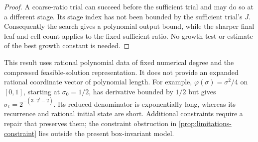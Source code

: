 \begin{proof}
A coarse-ratio trial can succeed before the sufficient trial and may do
so at a different stage.  Its stage index has not been bounded by the
sufficient trial's $J$.  Consequently the search gives a polynomial
output bound, while the sharper final leaf-and-cell count applies to the
fixed sufficient ratio.  No growth test or estimate of the best growth
constant is needed.
\end{proof}

This result uses rational polynomial data of fixed numerical degree and
the compressed feasible-solution representation.  It does not provide an
expanded rational coordinate vector of polynomial length.  For example,
$\varphi(\sigma)=\sigma^2/4$ on $[0,1]$, starting at $\sigma_0=1/2$,
has derivative bounded by $1/2$ but gives
$\sigma_t=2^{-(3\cdot2^t-2)}$.  Its reduced denominator is exponentially
long, whereas its recurrence and rational initial state are short.
Additional constraints require a repair that preserves them; the constraint
obstruction in \cref{prop:limitations-constraint} lies outside the present
box-invariant model.
